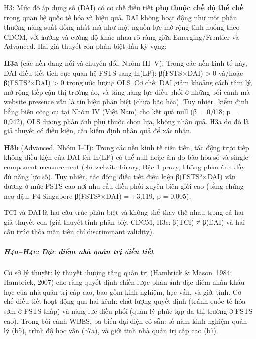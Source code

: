 \documentclass[
  a4paper,
  13pt]{extreport}
\begin{document}
H3: Mức độ áp dụng số (DAI) có cơ chế điều tiết \textbf{phụ thuộc chế độ
thể chế} trong quan hệ quốc tế hóa và hiệu quả. DAI không hoạt động như
một phần thưởng năng suất đồng nhất mà như một nguồn lực mở rộng tình
huống theo CDCM, với hướng và cường độ khác nhau rõ ràng giữa
Emerging/Frontier và Advanced. Hai giả thuyết con phân biệt dấu kỳ vọng:

\textbf{H3a} (các nền đang nổi và chuyển đổi, Nhóm III--V): Trong các
nền kinh tế này, DAI điều tiết tích cực quan hệ FSTS sang ln(LP):
β(FSTS×DAI) \textgreater{} 0 và/hoặc β(FSTS²×DAI) \textgreater{} 0 trong
ước lượng OLS. Cơ chế: DAI giảm khoảng cách tâm lý, mở rộng tiếp cận thị
trường ảo, và tăng năng lực điều phối ở những bối cảnh mà website
presence vẫn là tín hiệu phân biệt (chưa bão hòa). Tuy nhiên, kiểm định
bằng biến công cụ tại Nhóm IV (Việt Nam) cho kết quả null (β = 0,018; p
= 0,942), OLS dương phản ánh phụ thuộc chọn lựa, không nhân quả. H3a do
đó là giả thuyết có điều kiện, cần kiểm định nhân quả để xác nhận.

\textbf{H3b} (Advanced, Nhóm I--II): Trong các nền kinh tế tiên tiến,
tác động trực tiếp không điều kiện của DAI lên ln(LP) có thể null hoặc
âm do bão hòa số và single-component measurement (chỉ website binary,
Bậc 1 proxy, không phản ánh đầy đủ năng lực số). Tuy nhiên, tác động
điều tiết điều kiện β(FSTS²×DAI) vẫn dương ở mức FSTS cao nơi nhu cầu
điều phối xuyên biên giới cao (bằng chứng neo đậu: P4 Singapore
β(FSTS²×DAI) = +3,119, p = 0,005).

TCI và DAI là hai cấu trúc phân biệt và không thể thay thế nhau trong cả
hai giả thuyết con (giả thuyết tính phân biệt CDCM, H3c: β(TCI) ≠ β(DAI)
và hai cấu trúc thỏa mãn tiêu chí discriminant validity).

\hypertarget{h4ah4c-ux111ux1eb7c-ux111iux1ec3m-nhuxe0-quux1ea3n-trux1ecb-ux111iux1ec1u-tiux1ebft}{%
\subparagraph{H4a--H4c: Đặc điểm nhà quản trị điều
tiết}\label{h4ah4c-ux111ux1eb7c-ux111iux1ec3m-nhuxe0-quux1ea3n-trux1ecb-ux111iux1ec1u-tiux1ebft}}

Cơ sở lý thuyết: lý thuyết thượng tầng quản trị (Hambrick \& Mason,
1984; Hambrick, 2007) cho rằng quyết định chiến lược phản ánh đặc điểm
nhân khẩu học của nhà quản trị cấp cao, bao gồm kinh nghiệm, học vấn, và
giới tính. Cơ chế điều tiết hoạt động qua hai kênh: chất lượng quyết
định (tránh quốc tế hóa sớm ở FSTS thấp) và năng lực điều phối (quản lý
phức tạp đa thị trường ở FSTS cao). Trong bối cảnh WBES, ba biến đại
diện có sẵn: số năm kinh nghiệm quản lý (b5), trình độ học vấn (b7a), và
giới tính nhà quản trị cấp cao (b7).
\end{document}
